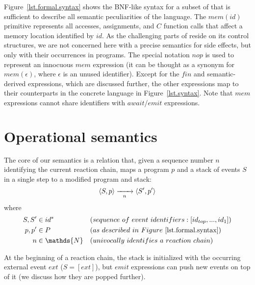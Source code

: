 Figure~\ref{lst.formal.syntax} shows the BNF-like syntax for a subset of \CEU 
that is sufficient to describe all semantic peculiarities of the language.
%
The $mem(id)$ primitive represents all accesses, assignments, and $C$ function 
calls that affect a memory location identified by $id$.
As the challenging parts of \CEU reside on its control structures, we are not 
concerned here with a precise semantics for side effects, but only with their 
occurrences in programs.
%
The special notation $nop$ is used to represent an innocuous $mem$ expression 
(it can be thought as a synonym for $mem(\epsilon)$, where $\epsilon$ is an 
unused identifier).
%
Except for the $fin$ and semantic-derived expressions, which are discussed 
further, the other expressions map to their counterparts in the concrete 
language in Figure~\ref{lst.syntax}.
%
Note that $mem$ expressions cannot share identifiers with $await$/$emit$ 
expressions.

\section{Operational semantics}
\label{sec.sem}

The core of our semantics is a relation that, given a sequence number $n$ 
identifying the current reaction chain, maps a program $p$ and a stack of 
events $S$ in a single step to a modified program and stack:
%
$$
\langle S, p \rangle
    \xrightarrow[~~n~~]{}
\langle S', p' \rangle
$$
%
where
%
\begin{align*}
S, S' &\in id^*
    &&(sequence~of~event~identifiers: [id_{top}, ..., id_1]) \\
p, p' &\in P
    && (as~described~in~Figure~\ref{lst.formal.syntax}) \\
n     &\in \mathds{N}
    && (univocally~identifies~a~reaction~chain)
\end{align*}

At the beginning of a reaction chain, the stack is initialized with the 
occurring external event $ext$ ($S=[ext]$), but $emit$ expressions can push new 
events on top of it (we discuss how they are popped further).

%
%

